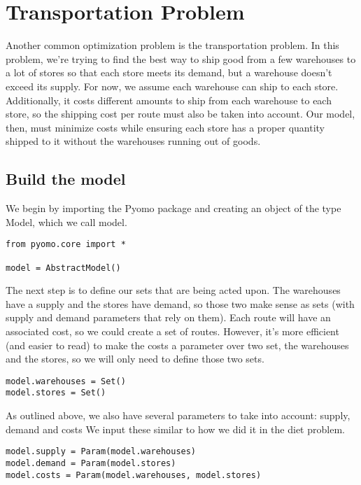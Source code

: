 \documentclass{article}
\begin{document}
\section*{Transportation Problem}

Another common optimization problem is the transportation problem.  In this problem, we're trying to find the best way to ship good from a few warehouses to a lot of stores so that each store meets its demand, but a warehouse doesn't exceed its supply.  For now, we assume each warehouse can ship to each store.  Additionally, it costs different amounts to ship from each warehouse to each store, so the shipping cost per route must also be taken into account.  Our model, then, must minimize costs while ensuring each store has a proper quantity shipped to it without the warehouses running out of goods.

\subsection*{Build the model}

We begin by importing the Pyomo package and creating an object of the type Model, which we call model.

\begin{verbatim}
from pyomo.core import *

model = AbstractModel()
\end{verbatim}

The next step is to define our sets that are being acted upon.  The warehouses have a supply and the stores have demand, so those two make sense as sets (with supply and demand parameters that rely on them).  Each route will have an associated cost, so we could create a set of routes.  However, it's more efficient (and easier to read) to make the costs a parameter over two set, the warehouses and the stores, so we will only need to define those two sets.

\begin{verbatim}
model.warehouses = Set()
model.stores = Set()
\end{verbatim}

As outlined above, we also have several parameters to take into account: supply, demand and costs  We input these similar to how we did it in the diet problem.

\begin{verbatim}
model.supply = Param(model.warehouses)
model.demand = Param(model.stores)
model.costs = Param(model.warehouses, model.stores)
\end{verbatim}
\end{document}
